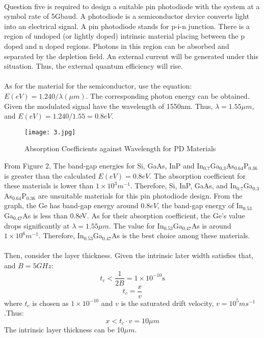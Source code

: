 \documentclass[12pt]{article}
\begin{document}
    \paragraph{}
    Question five is required to design a suitable pin photodiode with the system at a symbol rate of 5Gbaud. A photodiode is a semiconductor device converts light into an electrical signal. A pin photodiode stands for p-i-n junction. There is a region of undoped (or lightly doped) intrinsic material placing between the p doped and n doped regions. Photons in this region can be absorbed and separated by the depletion field. An external current will be generated under this situation. Thus, the external quantum efficiency will rise.
    \paragraph{}
    As for the material for the semiconductor, use the equation: $E(eV)=1.240/\lambda(\mu m)$. The corresponding photon energy can be obtained. Given the modulated signal have the wavelength of 1550nm. Thus, $\lambda = 1.55\mu m$, and $E(eV)=1.240 / 1.55 = 0.8eV$.
    \begin{figure}[H]
    \centering
    \texttt{[image: 3.jpg]}
    \caption{Absorption Coefficients against Wavelength for PD Materials }
    \end{figure}
    From Figure 2, The band-gap energies for Si, GaAs, InP and In$_{0.7}$Ga$_{0.3}$As$_{0.64}$P$_{0.36}$ is greater than the calculated $E(eV)=0.8eV$. The absorption coefficient for these materials is lower than $1\times 10^3 m^{-1}$. Therefore, Si, InP, GaAs, and In$_{0.7}$Ga$_{0.3}$As$_{0.64}$P$_{0.36}$ are unsuitable materials for this pin photodiode design. From the graph, the Ge has band-gap energy around 0.8$eV$, the band-gap energy of In$_{0.53}$Ga$_{0.47}$As is less than 0.8eV. As for their absorption coefficient, the Ge's value drops significantly at $\lambda=1.55 \mu m$. The value for In$_{0.53}$Ga$_{0.47}$As is around $1 \times 10^6m^{-1}$. Therefore, In$_{0.53}$Ga$_{0.47}$As is the best choice among these materials.
    \paragraph{}
    Then, consider the layer thickness. Given the intrinsic later width satisfies that, and $B=5GHz$:
    \begin{equation}
        t_c < \frac{1}{2B} = 1 \times 10^{-10}\mbox{s}
    \end{equation}
    \begin{equation}
        t_c = \frac{x}{v}
    \end{equation}
    where $t_c$ is chosen as $1 \times 10^{-10}$ and $v$ is the saturated drift velocity, $v=10^5 ms^{-1}$.Thus:
    \begin{equation}
         x < t_c\cdot v = 10\mu m
    \end{equation}
    The intrinsic layer thickness can be 10$\mu m$.
\end{document}
